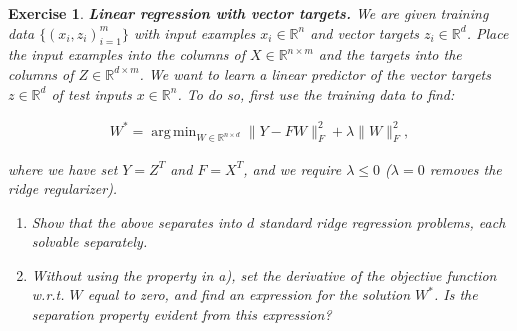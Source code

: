 \documentclass[12pt]{article}
\DeclareMathOperator*{\argmin}{arg\,min}
\theoremstyle{colon}
\newtheorem{exercise}{Exercise}
\begin{document}
\begin{exercise}
  \textbf{Linear regression with vector targets.} We are given training data $\{ (x_i, z_i)_{i=1}^m \}$ with input examples $x_i \in \mathbb{R}^n$ and vector targets $z_i \in \mathbb{R}^d$. Place the input examples into the columns of $X \in \mathbb{R}^{n \times m}$ and the targets into the columns of $Z \in \mathbb{R}^{d \times m}$. We want to learn a linear predictor of the vector targets $z \in \mathbb{R}^d$ of test inputs $x \in \mathbb{R}^n$. To do so, first use the training data to find:

  \begin{gather*}
    W^* = \argmin_{W \in \mathbb{R}^{n \times d}} \lVert Y - FW \rVert_F^2 + \lambda \lVert W \rVert_F^2,
  \end{gather*}

  where we have set $Y = Z^T$ and $F = X^T$, and we require $\lambda \leq 0$ ($\lambda = 0$ removes the ridge regularizer).

  \begin{enumerate}[label=\alph*)]
    \item Show that the above separates into $d$ standard ridge regression problems, each solvable separately.
    \item Without using the property in a), set the derivative of the objective function w.r.t. $W$ equal to zero, and find an expression for the solution $W^*$. Is the separation property evident from this expression?
  \end{enumerate}
\end{exercise}
\end{document}
